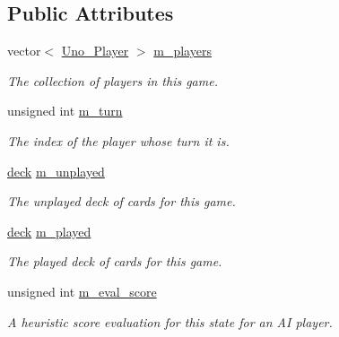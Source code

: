 \subsection*{\-Public \-Attributes}
\begin{DoxyCompactItemize}
\item 
\hypertarget{class_uno___game___state_adff61ccfa1552c4524e781aeee6ed95a}{
vector$<$ \hyperlink{class_uno___player}{\-Uno\-\_\-\-Player} $>$ \hyperlink{class_uno___game___state_adff61ccfa1552c4524e781aeee6ed95a}{m\-\_\-players}}
\label{class_uno___game___state_adff61ccfa1552c4524e781aeee6ed95a}

\begin{DoxyCompactList}\small\item\em \-The collection of players in this game. \end{DoxyCompactList}\item 
\hypertarget{class_uno___game___state_a85a2ea5d9e50359519aeeef2589fa8cf}{
unsigned int \hyperlink{class_uno___game___state_a85a2ea5d9e50359519aeeef2589fa8cf}{m\-\_\-turn}}
\label{class_uno___game___state_a85a2ea5d9e50359519aeeef2589fa8cf}

\begin{DoxyCompactList}\small\item\em \-The index of the player whose turn it is. \end{DoxyCompactList}\item 
\hyperlink{uno__deck_8h_ab634a15f4d19d3af113a71241b79c408}{deck} \hyperlink{class_uno___game___state_a7bf61c252c9de176f309b691b4038345}{m\-\_\-unplayed}
\begin{DoxyCompactList}\small\item\em \-The unplayed deck of cards for this game. \end{DoxyCompactList}\item 
\hyperlink{uno__deck_8h_ab634a15f4d19d3af113a71241b79c408}{deck} \hyperlink{class_uno___game___state_ae274bd2383addaefbc78556c48757c35}{m\-\_\-played}
\begin{DoxyCompactList}\small\item\em \-The played deck of cards for this game. \end{DoxyCompactList}\item 
unsigned int \hyperlink{class_uno___game___state_ad55fa08fbfc6ddf4359194857dbd99fc}{m\-\_\-eval\-\_\-score}
\begin{DoxyCompactList}\small\item\em \-A heuristic score evaluation for this state for an \-A\-I player. \end{DoxyCompactList}\end{DoxyCompactItemize}


